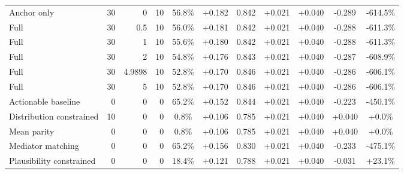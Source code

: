 \begin{table}[htbp]
\begin{tabular}{lrrrccccccc}
Anchor only & 30 & 0 & 10 & 56.8\% & +0.182 & 0.842 & +0.021 & +0.040 & -0.289 & -614.5\% \\
Full & 30 & 0.5 & 10 & 56.0\% & +0.181 & 0.842 & +0.021 & +0.040 & -0.288 & -611.3\% \\
Full & 30 & 1 & 10 & 55.6\% & +0.180 & 0.842 & +0.021 & +0.040 & -0.288 & -611.3\% \\
Full & 30 & 2 & 10 & 54.8\% & +0.176 & 0.843 & +0.021 & +0.040 & -0.287 & -608.9\% \\
Full & 30 & 4.9898 & 10 & 52.8\% & +0.170 & 0.846 & +0.021 & +0.040 & -0.286 & -606.1\% \\
Full & 30 & 5 & 10 & 52.8\% & +0.170 & 0.846 & +0.021 & +0.040 & -0.286 & -606.1\% \\
Actionable baseline & 0 & 0 & 0 & 65.2\% & +0.152 & 0.844 & +0.021 & +0.040 & -0.223 & -450.1\% \\
Distribution constrained & 10 & 0 & 0 & 0.8\% & +0.106 & 0.785 & +0.021 & +0.040 & +0.040 & +0.0\% \\
Mean parity & 0 & 0 & 0 & 0.8\% & +0.106 & 0.785 & +0.021 & +0.040 & +0.040 & +0.0\% \\
Mediator matching & 0 & 0 & 0 & 65.2\% & +0.156 & 0.830 & +0.021 & +0.040 & -0.233 & -475.1\% \\
Plausibility constrained & 0 & 0 & 0 & 18.4\% & +0.121 & 0.788 & +0.021 & +0.040 & -0.031 & +23.1\% \\
\bottomrule
\end{tabular}
\end{table}
